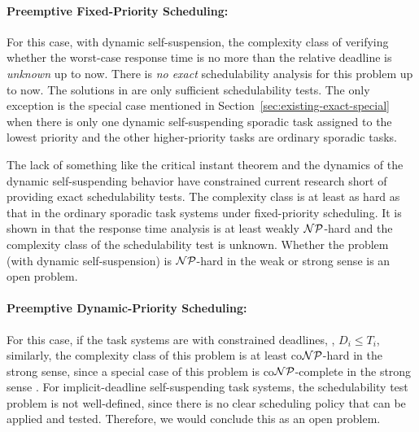 \paragraph{Preemptive Fixed-Priority Scheduling:}   

For this case, with dynamic self-suspension, the complexity class of verifying whether the worst-case response time is no more than the relative deadline is \emph{unknown} up to now. There is \emph{no exact} schedulability analysis for this problem up to now. The solutions in \cite{Liu:2000:RS:518501,LiuChen:rtss2014,huangpass:dac2015,ChenECRTS2016-suspension} are only sufficient schedulability tests. The only exception is the special case mentioned in Section~\ref{sec:existing-exact-special} when there is only one dynamic self-suspending sporadic task assigned to the lowest priority and the other higher-priority tasks are ordinary sporadic tasks. 


The lack of something like the critical instant theorem and the dynamics of the dynamic self-suspending behavior have constrained current research short of providing exact schedulability tests. The complexity class is at least as hard as that in the ordinary sporadic task systems under fixed-priority scheduling. It is shown in \cite{EisenbrandR08} that the response time analysis is at least weakly ${\cal NP}$-hard and the complexity class of the schedulability test is unknown. Whether the problem (with dynamic self-suspension) is ${\cal NP}$-hard in the weak or strong sense is an open problem.

\paragraph{Preemptive Dynamic-Priority Scheduling:} 
For this case, if the task systems are with constrained deadlines, \ie, $D_i \leq T_i$, similarly, the complexity class of this problem is at least co${\cal NP}$-hard in the strong sense, since a special case of this problem is co${\cal NP}$-complete in the strong sense \cite{DBLP:conf/ecrts/Ekberg015}. For implicit-deadline self-suspending task systems, the schedulability test problem is not well-defined, since there is no clear scheduling policy that can be applied and tested. Therefore, we would conclude this as an open problem.





  
